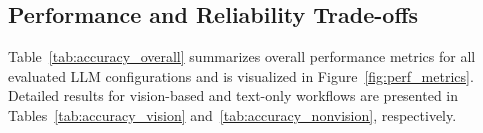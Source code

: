 \documentclass[conference]{IEEEtran}
\begin{document}
\subsection{Performance and Reliability Trade-offs}

Table~\ref{tab:accuracy_overall} summarizes overall performance metrics for all evaluated LLM configurations and is visualized in Figure~\ref{fig:perf_metrics}. Detailed results for vision-based and text-only workflows are presented in Tables~\ref{tab:accuracy_vision} and~\ref{tab:accuracy_nonvision}, respectively. %

\end{document}
